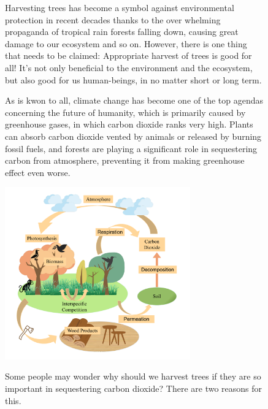 \documentclass{mcmthesis}
\numberwithin{figure}{section}
\numberwithin{table}{section}
\numberwithin{equation}{section}
\begin{document}
\begin{memo}

  \begin{figure}[ht]
    \hfill
    \begin{minipage}[htbp]{0.475\linewidth}
      \indent\setlength{\parindent}{1em}
      \par
      Harvesting trees has become a symbol against environmental protection in recent decades
      thanks to the over whelming propaganda of tropical rain forests falling down, causing
      great damage to our ecosystem and so on. However, there is one thing that needs to be 
      claimed: Appropriate harvest of trees is good for all! It's not only beneficial to
      the environment and the ecosystem, but also good for us human-beings, in no matter
      short or long term.
      \par
      As is kwon to all, climate change has become one of the top agendas concerning the 
      future of humanity, which is primarily caused by greenhouse gases, in which carbon
      dioxide ranks very high. Plants can absorb carbon dioxide vented by animals or released
      by burning fossil fuels, and forests are playing a significant role in sequestering
      carbon from atmosphere, preventing it from making greenhouse effect even worse. 
      \par
      \includegraphics[width = 8cm]{code&pic/大循环.pdf}
      \par
      Some people may wonder why should we harvest trees if they are so important in sequestering
      carbon dioxide? There are two reasons for this.  
    \end{minipage}
    \hfill
    \begin{minipage}[htbp]{0.475\linewidth}
      \indent\setlength{\parindent}{1em}
      \par

\end{minipage}
\end{figure}
\end{memo}
\end{document}
